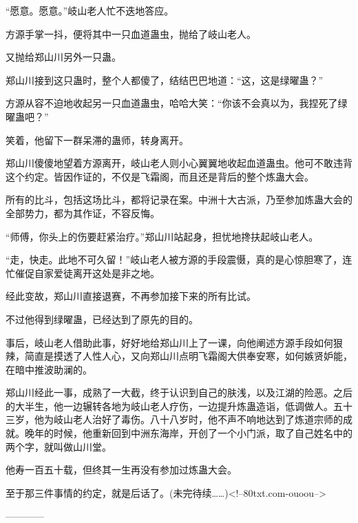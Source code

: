 \begin{this_body}
“愿意。愿意。”岐山老人忙不迭地答应。

方源手掌一抖，便将其中一只血道蛊虫，抛给了岐山老人。

又抛给郑山川另外一只蛊。

郑山川接到这只蛊时，整个人都傻了，结结巴巴地道：“这，这是绿曜蛊？”

方源从容不迫地收起另一只血道蛊虫，哈哈大笑：“你该不会真以为，我捏死了绿曜蛊吧？”

笑着，他留下一群呆滞的蛊师，转身离开。

郑山川傻傻地望着方源离开，岐山老人则小心翼翼地收起血道蛊虫。他可不敢违背这个约定。皆因作证的，不仅是飞霜阁，而且还是背后的整个炼蛊大会。

所有的比斗，包括这场比斗，都将记录在案。中洲十大古派，乃至参加炼蛊大会的全部势力，都为其作证，不容反悔。

“师傅，你头上的伤要赶紧治疗。”郑山川站起身，担忧地搀扶起岐山老人。

“走，快走。此地不可久留！”岐山老人被方源的手段震慑，真的是心惊胆寒了，连忙催促自家爱徒离开这处是非之地。

经此变故，郑山川直接退赛，不再参加接下来的所有比试。

不过他得到绿曜蛊，已经达到了原先的目的。

事后，岐山老人借助此事，好好地给郑山川上了一课，向他阐述方源手段如何狠辣，简直是摸透了人性人心，又向郑山川点明飞霜阁大供奉安寒，如何嫉贤妒能，在暗中推波助澜的。

郑山川经此一事，成熟了一大截，终于认识到自己的肤浅，以及江湖的险恶。之后的大半生，他一边辗转各地为岐山老人疗伤，一边提升炼蛊造诣，低调做人。五十三岁，他为岐山老人治好了毒伤。八十八岁时，他不声不响地达到了炼道宗师的成就。晚年的时候，他重新回到中洲东海岸，开创了一个小门派，取了自己姓名中的两个字，就叫做山川堂。

他寿一百五十载，但终其一生再没有参加过炼蛊大会。

至于那三件事情的约定，就是后话了。(未完待续……)<!--80txt.com-ouoou-->

------------

\end{this_body}

